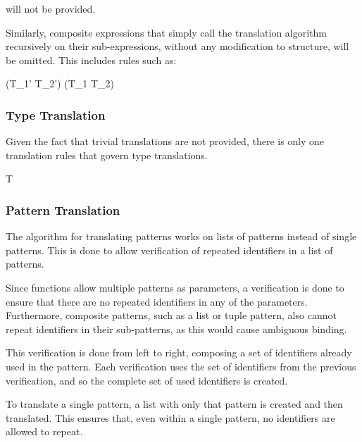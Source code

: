 \documentclass{article}
\begin{document}

will not be provided.

Similarly, composite expressions that simply call the translation algorithm recursively on their sub-expressions, without any modification to structure, will be omitted.
This includes rules such as:

  {\gamma \vdash (T_1' \rightarrow T_2') \Rightarrow (T_1 \rightarrow T_2)}

\subsubsection{Type Translation}

Given the fact that trivial translations are not provided, there is only one translation rules that govern type translations.

  {\gamma \vdash \tau \Rightarrow T}

\subsubsection{Pattern Translation}

The algorithm for translating patterns works on lists of patterns instead of single patterns.
This is done to allow verification of repeated identifiers in a list of patterns.

Since functions allow multiple patterns as parameters, a verification is done to ensure that there are no repeated identifiers in any of the parameters.
Furthermore, composite patterns, such as a list or tuple pattern, also cannot repeat identifiers in their sub-patterns, as this would cause ambiguous binding.

This verification is done from left to right, composing a set of identifiers already used in the pattern.
Each verification uses the set of identifiers from the previous verification, and so the complete set of used identifiers is created.

  {\gamma \vdash [p_1', \; \dots \; p_n'] \Rightarrow [p_1, \; \dots \; p_n]}

To translate a single pattern, a list with only that pattern is created and then translated.
This ensures that, even within a single pattern, no identifiers are allowed to repeat.
\end{document}
